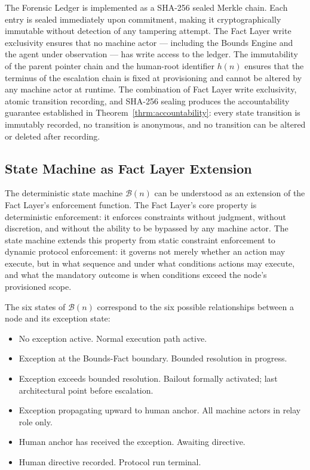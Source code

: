 The Forensic Ledger is implemented as a SHA-256 sealed Merkle chain. Each entry is sealed immediately upon commitment, making it cryptographically immutable without detection of any tampering attempt. The Fact Layer write exclusivity ensures that no machine actor --- including the Bounds Engine and the agent under observation --- has write access to the ledger. The immutability of the parent pointer chain and the human-root identifier $h(n)$ ensures that the terminus of the escalation chain is fixed at provisioning and cannot be altered by any machine actor at runtime. The combination of Fact Layer write exclusivity, atomic transition recording, and SHA-256 sealing produces the accountability guarantee established in Theorem~\ref{thrm:accountability}: every state transition is immutably recorded, no transition is anonymous, and no transition can be altered or deleted after recording.

\subsection{State Machine as Fact Layer Extension}
\label{sec:state-machine-fact-extension}

The deterministic state machine $\mathcal{B}(n)$ can be understood as an extension of the Fact Layer's enforcement function. The Fact Layer's core property is deterministic enforcement: it enforces constraints without judgment, without discretion, and without the ability to be bypassed by any machine actor. The state machine extends this property from static constraint enforcement to dynamic protocol enforcement: it governs not merely whether an action may execute, but in what sequence and under what conditions actions may execute, and what the mandatory outcome is when conditions exceed the node's provisioned scope.

The six states of $\mathcal{B}(n)$ correspond to the six possible relationships between a node and its exception state:

\begin{itemize}\itemsep=0pt
  \item[IDLE:] No exception active. Normal execution path active.
  \item[BOUNDED:] Exception at the Bounds-Fact boundary. Bounded resolution in progress.
  \item[BAIL\_PENDING:] Exception exceeds bounded resolution. Bailout formally activated; last architectural point before escalation.
  \item[ESCALATING:] Exception propagating upward to human anchor. All machine actors in relay role only.
  \item[HUMAN\_ACKNOWLEDGED:] Human anchor has received the exception. Awaiting directive.
  \item[RESOLVED:] Human directive recorded. Protocol run terminal.
\end{itemize}

